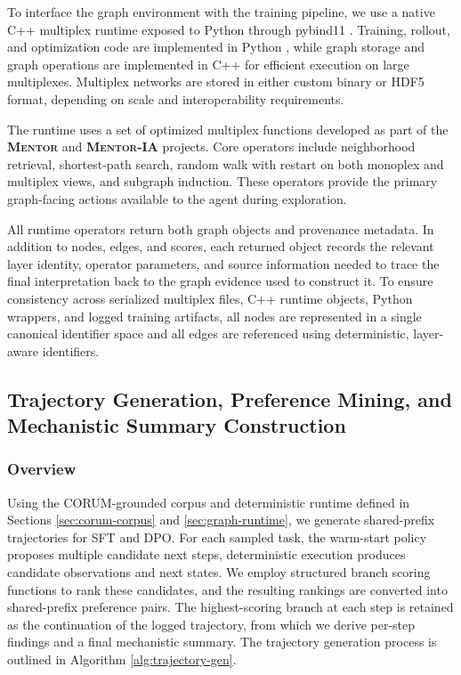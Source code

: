 \documentclass[thesis,letterpaper,12pt]{utthesis}
\begin{document}
To interface the graph environment with the training pipeline, we use a native C++ \cite{cpp} multiplex runtime exposed to Python through pybind11 \cite{pybind11}. Training, rollout, and optimization code are implemented in Python \cite{python}, while graph storage and graph operations are implemented in C++ for efficient execution on large multiplexes. Multiplex networks are stored in either custom binary or HDF5 format, depending on scale and interoperability requirements.

The runtime uses a set of optimized multiplex functions developed as part of the \textsc{\textbf{Mentor}} \cite{mentor} and \textsc{\textbf{Mentor-IA}} \cite{mentor-ia} projects. Core operators include neighborhood retrieval, shortest-path search, random walk with restart on both monoplex and multiplex views, and subgraph induction. These operators provide the primary graph-facing actions available to the agent during exploration.

All runtime operators return both graph objects and provenance metadata. In addition to nodes, edges, and scores, each returned object records the relevant layer identity, operator parameters, and source information needed to trace the final interpretation back to the graph evidence used to construct it. To ensure consistency across serialized multiplex files, C++ runtime objects, Python wrappers, and logged training artifacts, all nodes are represented in a single canonical identifier space and all edges are referenced using deterministic, layer-aware identifiers.

\subsection{Trajectory Generation, Preference Mining, and Mechanistic Summary Construction}\label{sec:trajectory}

\subsubsection{Overview}
Using the CORUM-grounded corpus and deterministic runtime defined in Sections \ref{sec:corum-corpus} and \ref{sec:graph-runtime}, we generate shared-prefix trajectories for SFT and DPO. For each sampled task, the warm-start policy proposes multiple candidate next steps, deterministic execution produces candidate observations and next states. We employ structured branch scoring functions to rank these candidates, and the resulting rankings are converted into shared-prefix preference pairs. The highest-scoring branch at each step is retained as the continuation of the logged trajectory, from which we derive per-step findings and a final mechanistic summary. The trajectory generation process is outlined in Algorithm \ref{alg:trajectory-gen}.
\end{document}

